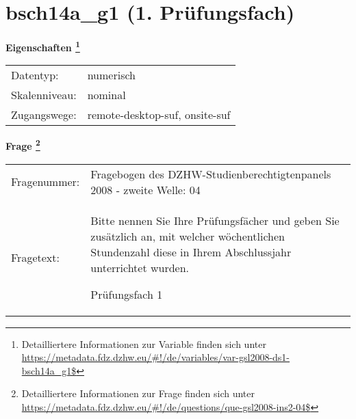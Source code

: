 
    \setcounter{footnote}{0}

    \vspace*{-1.8cm}
	\section{bsch14a\_g1 (1. Prüfungsfach)}
	\label{section:bsch14a_g1}



    \vspace*{0.5cm}
    \noindent\textbf{Eigenschaften
	\footnote{Detailliertere Informationen zur Variable finden sich unter
		\url{https://metadata.fdz.dzhw.eu/\#!/de/variables/var-gsl2008-ds1-bsch14a_g1$}}}\\
	\begin{tabularx}{\hsize}{@{}lX}
	Datentyp: & numerisch \\
	Skalenniveau: & nominal \\
	Zugangswege: &
	  remote-desktop-suf, 
	  onsite-suf
 \\
    \end{tabularx}



				\vspace*{0.5cm}
                \noindent\textbf{Frage
	                \footnote{Detailliertere Informationen zur Frage finden sich unter
		              \url{https://metadata.fdz.dzhw.eu/\#!/de/questions/que-gsl2008-ins2-04$}}}\\
				\begin{tabularx}{\hsize}{@{}lX}
					Fragenummer: &
					  Fragebogen des DZHW-Studienberechtigtenpanels 2008 - zweite Welle:
					  04
 \\
					Fragetext: & Bitte nennen Sie Ihre Prüfungsfächer und geben Sie zusätzlich an, mit welcher wöchentlichen Stundenzahl diese in Ihrem Abschlussjahr unterrichtet wurden.\par  Prüfungsfach 1 \\
				\end{tabularx}






